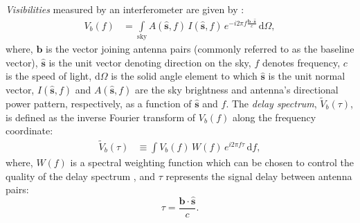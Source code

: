 \documentclass[preprint2,iop,numberedappendix,twocolappendix,appendixfloats]{emulateapj}
\newcommand{\dif}{\mathrm{d}}
\begin{document}
{\it Visibilities} measured by an interferometer are given by \citep{van34,zer38,tho01}:
\begin{align}\label{eqn:obsvis}
  V_b(f) &= \int\limits_\textrm{sky} A(\hat{\boldsymbol{s}},f)\,I(\hat{\boldsymbol{s}},f)\,e^{-i2\pi f\frac{\boldsymbol{b}\cdot\hat{\boldsymbol{s}}}{c}}\,\dif\Omega,
\end{align}
where, $\boldsymbol{b}$ is the vector joining antenna pairs (commonly referred to as the baseline vector), $\hat{\boldsymbol{s}}$ is the unit vector denoting direction on the sky, $f$ denotes frequency, $c$ is the speed of light, $\dif\Omega$ is the solid angle element to which $\hat{\boldsymbol{s}}$ is the unit normal vector, $I(\hat{\boldsymbol{s}},f)$ and $A(\hat{\boldsymbol{s}},f)$ are the sky brightness and antenna's directional power pattern, respectively, as a function of $\hat{\boldsymbol{s}}$ and $f$. The {\it delay spectrum}, $\tilde{V}_b(\tau)$, is defined as the inverse Fourier transform of $V_b(f)$ along the frequency coordinate:
\begin{align}\label{eqn:delay-transform}
  \tilde{V}_b(\tau) &\equiv \int V_b(f)\,W(f)\,e^{i2\pi f\tau}\,\dif f,
\end{align}
where, $W(f)$ is a spectral weighting function which can be chosen to control the quality of the delay spectrum \citep{ved12,thy13}, and $\tau$ represents the signal delay between antenna pairs:
\begin{equation}\label{eqn:delay}
  \tau = \frac{\boldsymbol{b}\cdot\hat{\boldsymbol{s}}}{c}.
\end{equation}
\end{document}
